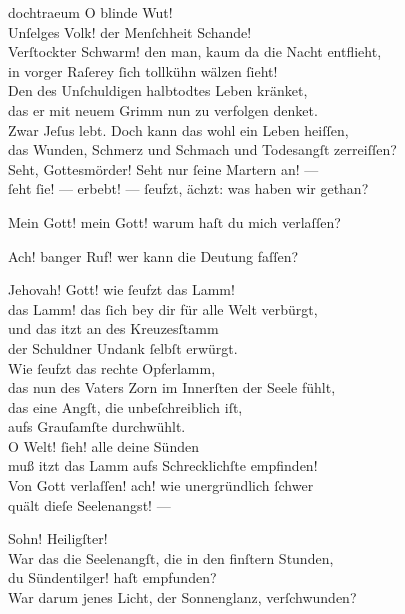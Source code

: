 \documentclass[shorttitlesize=50,tocstyle=ref-genre]{ees}
\begin{document}
{\begin{movement}{dochtraeum}
    \voice[Johannes]
    \hspace*{3cm}O blinde Wut!\\
    Unſelges Volk! der Menſchheit Schande!\\
    Verſtockter Schwarm! den man, kaum da die Nacht entflieht,\\
    in vorger Raſerey ſich tollkühn wälzen ſieht!\\
    Den des Unſchuldigen halbtodtes Leben kränket,\\
    das er mit neuem Grimm nun zu verfolgen denket.\\
    Zwar Jeſus lebt. Doch kann das wohl ein Leben heiſſen,\\
    das Wunden, Schmerz und Schmach und Todesangſt zerreiſſen?\\
    Seht, Gottesmörder! Seht nur ſeine Martern an! —\\
    ſeht ſie! — erbebt! — ſeufzt, ächzt: was haben wir gethan?

    \voice[Jeſus]
    Mein Gott! mein Gott! warum haſt du mich verlaſſen?

    Ach! banger Ruf! wer kann die Deutung faſſen?\\\strut

    \voice[Johannes]
    Jehovah! Gott! wie ſeufzt das Lamm!\\
    das Lamm! das ſich bey dir für alle Welt verbürgt,\\
    und das itzt an des Kreuzesſtamm\\
    der Schuldner Undank ſelbſt erwürgt.\\
    Wie ſeufzt das rechte Opferlamm,\\
    das nun des Vaters Zorn im Innerſten der Seele fühlt,\\
    das eine Angſt, die unbeſchreiblich iſt,\\
    aufs Grauſamſte durchwühlt.\\
    O Welt! ſieh! alle deine Sünden\\
    muß itzt das Lamm aufs Schrecklichſte empfinden!\\
    Von Gott verlaſſen! ach! wie unergründlich ſchwer\\
    quält dieſe Seelenangst! —

    \voice[Maria]
    \hspace*{3cm} Sohn! Heiligſter!\\
    War das die Seelenangſt, die in den finſtern Stunden,\\
    du Sündentilger! haſt empfunden?\\
    War darum jenes Licht, der Sonnenglanz, verſchwunden?


\end{movement}}
\end{document}
